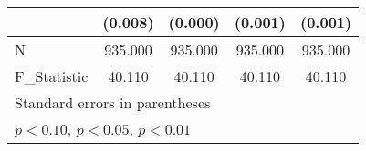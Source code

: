 {\begin{tabular}{l*{4}{c}}
            &     (0.008)         &     (0.000)         &     (0.001)         &     (0.001)         \\
\hline
N           &     935.000         &     935.000         &     935.000         &     935.000         \\
F\_Statistic &      40.110         &      40.110         &      40.110         &      40.110         \\
\hline\hline
\multicolumn{5}{l}{\footnotesize Standard errors in parentheses}\\
\multicolumn{5}{l}{\footnotesize \sym{*} \(p<0.10\), \sym{**} \(p<0.05\), \sym{***} \(p<0.01\)}\\
\end{tabular}
}

